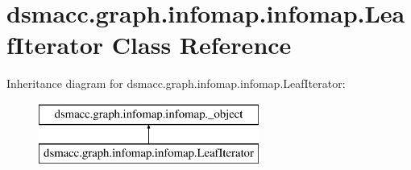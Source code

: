 \hypertarget{classdsmacc_1_1graph_1_1infomap_1_1infomap_1_1LeafIterator}{}\section{dsmacc.\+graph.\+infomap.\+infomap.\+Leaf\+Iterator Class Reference}
\label{classdsmacc_1_1graph_1_1infomap_1_1infomap_1_1LeafIterator}
Inheritance diagram for dsmacc.\+graph.\+infomap.\+infomap.\+Leaf\+Iterator\+:\begin{figure}[H]
\begin{center}
\leavevmode
\includegraphics[height=2.000000cm]{classdsmacc_1_1graph_1_1infomap_1_1infomap_1_1LeafIterator}
\end{center}
\end{figure}
